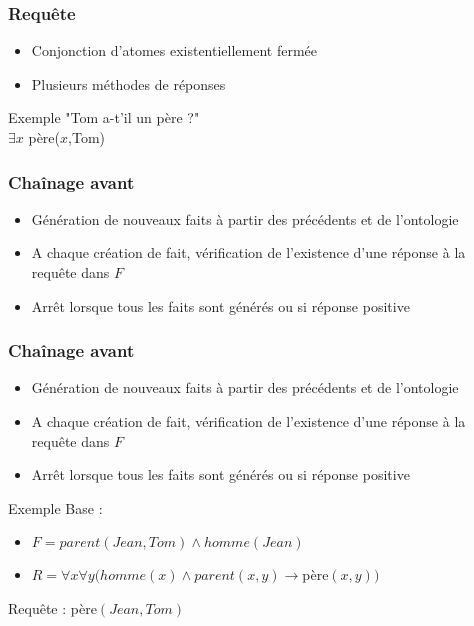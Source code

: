 
\begin{frame}
	\frametitle{Requête}
	\begin{itemize}
		\item Conjonction d'atomes existentiellement fermée
		\item Plusieurs méthodes de réponses
	\end{itemize}
	\vspace{10mm}
	\begin{exampleblock}{Exemple}
		"Tom a-t'il un père ?"\\
		$\exists x$ père($x$,Tom)
	\end{exampleblock}
\end{frame}

\begin{frame}[t]
	\frametitle{Chaînage avant}
	\begin{itemize}
		\item Génération de nouveaux faits à partir des précédents et de l'ontologie
		\item A chaque création de fait, vérification de l'existence d'une réponse à la 
		requête dans $F$
		\item Arrêt lorsque tous les faits sont générés ou si réponse positive
	\end{itemize}
\end{frame}


\begin{frame}[t]
	\frametitle{Chaînage avant}
	\begin{itemize}
		\item Génération de nouveaux faits à partir des précédents et de l'ontologie
		\item A chaque création de fait, vérification de l'existence d'une réponse à la 
		requête dans $F$
		\item Arrêt lorsque tous les faits sont générés ou si réponse positive
	\end{itemize}

	\begin{exampleblock}{Exemple}
	Base :
	\begin{itemize}
		\item $F = parent(Jean,Tom) \wedge homme(Jean)$
		\item $R = \forall x \forall y (homme(x) \wedge parent(x,y) \rightarrow
		$père$(x,y))$
	\end{itemize}
	Requête : père$(Jean,Tom)$
	\end{exampleblock}
\end{frame}


